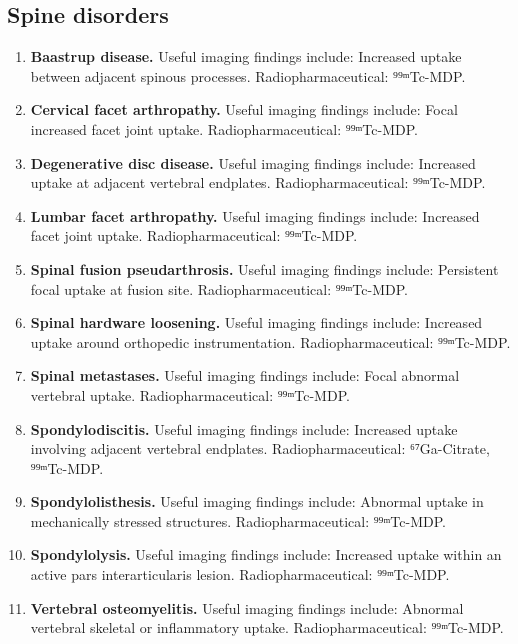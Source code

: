 \subsection{Spine disorders}
\begin{enumerate}[leftmargin=*,itemsep=0.45em,topsep=0.4em]
\item \textbf{Baastrup disease.} Useful imaging findings include: Increased uptake between adjacent spinous processes. Radiopharmaceutical: ⁹⁹ᵐTc-MDP.
\item \textbf{Cervical facet arthropathy.} Useful imaging findings include: Focal increased facet joint uptake. Radiopharmaceutical: ⁹⁹ᵐTc-MDP.
\item \textbf{Degenerative disc disease.} Useful imaging findings include: Increased uptake at adjacent vertebral endplates. Radiopharmaceutical: ⁹⁹ᵐTc-MDP.
\item \textbf{Lumbar facet arthropathy.} Useful imaging findings include: Increased facet joint uptake. Radiopharmaceutical: ⁹⁹ᵐTc-MDP.
\item \textbf{Spinal fusion pseudarthrosis.} Useful imaging findings include: Persistent focal uptake at fusion site. Radiopharmaceutical: ⁹⁹ᵐTc-MDP.
\item \textbf{Spinal hardware loosening.} Useful imaging findings include: Increased uptake around orthopedic instrumentation. Radiopharmaceutical: ⁹⁹ᵐTc-MDP.
\item \textbf{Spinal metastases.} Useful imaging findings include: Focal abnormal vertebral uptake. Radiopharmaceutical: ⁹⁹ᵐTc-MDP.
\item \textbf{Spondylodiscitis.} Useful imaging findings include: Increased uptake involving adjacent vertebral endplates. Radiopharmaceutical: ⁶⁷Ga-Citrate, ⁹⁹ᵐTc-MDP.
\item \textbf{Spondylolisthesis.} Useful imaging findings include: Abnormal uptake in mechanically stressed structures. Radiopharmaceutical: ⁹⁹ᵐTc-MDP.
\item \textbf{Spondylolysis.} Useful imaging findings include: Increased uptake within an active pars interarticularis lesion. Radiopharmaceutical: ⁹⁹ᵐTc-MDP.
\item \textbf{Vertebral osteomyelitis.} Useful imaging findings include: Abnormal vertebral skeletal or inflammatory uptake. Radiopharmaceutical: ⁹⁹ᵐTc-MDP.
\end{enumerate}

